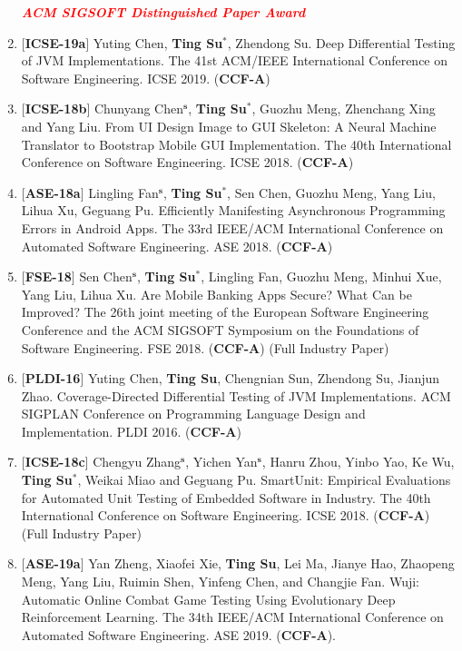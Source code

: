 \documentclass[margin]{res}
\begin{document}
\begin{resume}
\begin{enumerate}[leftmargin=*]
    \textbf{\emph{\textcolor{red}{ACM SIGSOFT Distinguished Paper Award}}}
    \item $[$\textbf{ICSE-19a}$]$ Yuting Chen, \textbf{Ting Su$^{\textbf{*}}$}, Zhendong Su. Deep Differential Testing of JVM Implementations. The 41st ACM/IEEE International Conference on Software Engineering. ICSE 2019. (\textbf{CCF-A})
    \item $[$\textbf{ICSE-18b}$]$ Chunyang Chen$^{\textbf{s}}$, \textbf{Ting Su$^{\textbf{*}}$}, Guozhu Meng, Zhenchang Xing and Yang Liu. From UI Design Image to GUI Skeleton: A Neural Machine Translator to Bootstrap Mobile GUI Implementation. The 40th International Conference on Software Engineering. ICSE 2018. (\textbf{CCF-A})
    \item $[$\textbf{ASE-18a}$]$ Lingling Fan$^{\textbf{s}}$, \textbf{Ting Su$^{\textbf{*}}$}, Sen Chen, Guozhu Meng, Yang Liu, Lihua Xu, Geguang Pu. Efficiently Manifesting Asynchronous Programming Errors in Android Apps. The 33rd IEEE/ACM International Conference on Automated Software Engineering. ASE 2018. (\textbf{CCF-A})
    \item $[$\textbf{FSE-18}$]$ Sen Chen$^{\textbf{s}}$, \textbf{Ting Su$^{\textbf{*}}$}, Lingling Fan, Guozhu Meng, Minhui Xue, Yang Liu, Lihua Xu. Are Mobile Banking Apps Secure? What Can be Improved? The 26th joint meeting of the European Software Engineering Conference and the ACM SIGSOFT Symposium on the Foundations of Software Engineering. FSE 2018. (\textbf{CCF-A}) (Full Industry Paper)
    \item $[$\textbf{PLDI-16}$]$ Yuting Chen, \textbf{Ting Su}, Chengnian Sun, Zhendong Su, Jianjun Zhao. Coverage-Directed Differential Testing of JVM Implementations. ACM SIGPLAN Conference on Programming Language Design and Implementation. PLDI 2016. (\textbf{CCF-A})
    \item $[$\textbf{ICSE-18c}$]$ Chengyu Zhang$^{\textbf{s}}$, Yichen Yan$^{\textbf{s}}$, Hanru Zhou, Yinbo Yao, Ke Wu, \textbf{Ting Su$^{\textbf{*}}$}, Weikai Miao and Geguang Pu. SmartUnit: Empirical Evaluations for Automated Unit Testing of Embedded Software in Industry. The 40th International Conference on Software Engineering. ICSE 2018. (\textbf{CCF-A}) (Full Industry Paper)
    \item $[$\textbf{ASE-19a}$]$ Yan Zheng, Xiaofei Xie, \textbf{Ting Su}, Lei Ma, Jianye Hao, Zhaopeng Meng, Yang Liu, Ruimin Shen, Yinfeng Chen, and Changjie Fan. Wuji: Automatic Online Combat Game Testing Using Evolutionary Deep Reinforcement Learning. The 34th IEEE/ACM International Conference on Automated Software Engineering. ASE 2019. (\textbf{CCF-A}).
    

\end{enumerate}
\end{resume}
\end{document}
